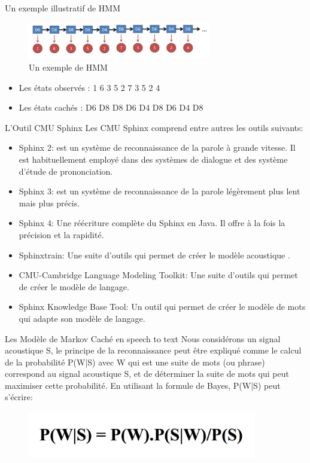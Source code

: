 \begin{frame}{Un exemple illustratif de HMM}

\begin{figure}
\centering
\includegraphics[width=8cm]{images/hmm1.png}
\caption{Un exemple de HMM}
\end{figure}
\begin{itemize}
\item Les états observés : 1 6 3 5 2 7 3 5 2 4
\item Les états cachés : D6 D8 D8 D6 D4 D8 D6 D4 D8
\end{itemize}

\end{frame}


\begin{frame}{L'Outil CMU Sphinx}
Les CMU Sphinx comprend entre autres les outils suivants:
\begin{itemize}
\item Sphinx 2: est un système de reconnaissance de la parole à grande vitesse. Il est habituellement employé dans des systèmes de dialogue et des système d'étude de prononciation.
\item Sphinx 3: est un système de reconnaissance de la parole légèrement plus lent mais plus précis.
\item Sphinx 4: Une réécriture complète du Sphinx en Java. Il offre à la fois la précision et la rapidité.
\item Sphinxtrain: Une suite d'outils qui permet de créer le modèle acoustique .
\item CMU-Cambridge Language Modeling Toolkit: Une suite d'outils qui permet de créer le modèle de langage.
\item Sphinx Knowledge Base Tool: Un outil qui permet de créer le modèle de mots qui adapte son modèle de langage. 
\end{itemize}

\end{frame}

\begin{frame}{Les Modèle de Markov Caché en speech to text}
Nous considérons un signal acoustique S, le principe de la reconnaissance peut être expliqué comme le calcul de la probabilité P(W|S) avec W qui est une suite de mots (ou phrase) correspond au signal acoustique S, et de déterminer la suite de mots qui peut maximiser cette probabilité.
En utilisant la formule de Bayes, P(W|S) peut s'écrire:
\begin{figure}
\centering
\includegraphics[width=10cm]{images/hmm_formule.png}
\end{figure}

\end{frame}

